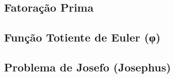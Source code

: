 \subsection{Fatoração Prima}


% 

% 

\subsection{Função Totiente de Euler (φ)}


% 

% 

% 

% 

\subsection{Problema de Josefo (Josephus)}


% 

